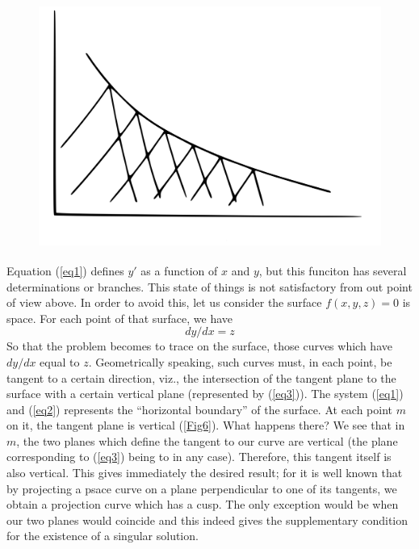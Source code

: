 \documentclass[12pt,oneside]{book}
\begin{document}
\begin{figure}
    \centering
    \includegraphics[height=8cm]{Fig5.jpeg}
    \caption{}
    \label{Fig5}
\end{figure}

Equation (\ref{eq1}) defines $y'$ as a function of $x$ and $y$, but this funciton has several determinations or branches. This state of things is not satisfactory from out point of view above. In order to avoid this, let us consider the surface $f(x,y,z)=0$ is space. For each point of that surface, we have
\begin{equation}
    dy/dx=z
    \label{eq3}
\end{equation}
So that the problem becomes to trace on the surface, those curves which have $dy/dx$ equal to $z$. Geometrically speaking, such curves must, in each point, be tangent to a certain direction, viz., the intersection of the tangent plane to the surface with a certain vertical plane (represented by (\ref{eq3})). The system (\ref{eq1}) and (\ref{eq2}) represents the ``horizontal boundary'' of the surface. At each point $m$ on it, the tangent plane is vertical (\ref{Fig6}). What happens there? We see that in $m$, the two planes which define the tangent to our curve are vertical (the plane corresponding to (\ref{eq3}) being to in any case). Therefore, this tangent itself is also vertical. This gives immediately the desired result; for it is well known that by projecting a psace curve on a plane perpendicular to one of its tangents, we obtain a projection curve which has a cusp. The only exception would be when our two planes would coincide and this indeed gives the supplementary condition for the existence of a singular solution. \par
\end{document}

